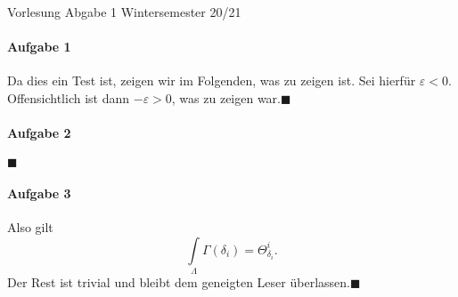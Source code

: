 \documentclass[a4paper]{article}
\begin{document}
\renewcommand{\rmdefault}{\sfdefault}
\newcommand{\quoderat}{\hfill$\blacksquare$}
\setlength{\parindent}{0pt}
\pagestyle{fancy}
\lhead
  {
  \large
  Vorlesung}
\chead
  {
  \large
   Abgabe 1}
\rhead
  {
  \large
  Wintersemester 20/21}
\paragraph{Aufgabe 1} Da dies ein Test ist, zeigen wir im Folgenden, was zu zeigen ist. Sei hierfür $\varepsilon < 0$.
Offensichtlich ist dann $-\varepsilon > 0$, was zu zeigen war.\quoderat
\paragraph{Aufgabe 2} \blindtext\quoderat
\paragraph{Aufgabe 3} \blindtext
Also gilt
\[\int\limits_\Lambda \Gamma(\delta_i)=\Theta^i_{\delta_i}.\]
\blindtext
Der Rest ist trivial und bleibt dem geneigten Leser überlassen.\quoderat
\cfoot
  {
  \hphantom{X}}
\rfoot
  {\thepage}
\end{document}
